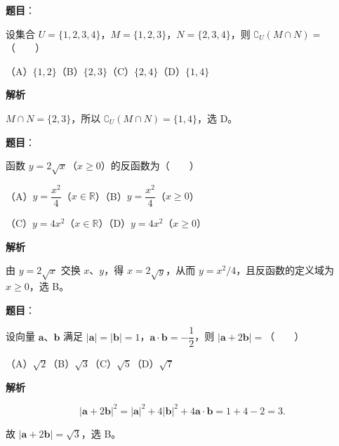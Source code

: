

\begin{answer}

\textbf{题目}：

设集合 $U=\{1,2,3,4\}$，$M=\{1,2,3\}$，$N=\{2,3,4\}$，则 $\complement_U(M\cap N)=$\mbox{（　　）}

（A）$\{1,2\}$\quad（B）$\{2,3\}$\quad（C）$\{2,4\}$\quad（D）$\{1,4\}$

\textbf{解析}

$M\cap N=\{2,3\}$，所以
$\complement_U(M\cap N)=\{1,4\}$，选 D。


\end{answer}
\begin{answer}

\textbf{题目}：

函数 $y=2\sqrt{x}$（$x\geq0$）的反函数为\mbox{（　　）}

（A）$y=\dfrac{x^2}{4}$（$x\in\mathbb R$）\quad（B）$y=\dfrac{x^2}{4}$（$x\geq0$）

（C）$y=4x^2$（$x\in\mathbb R$）\quad（D）$y=4x^2$（$x\geq0$）

\textbf{解析}

由 $y=2\sqrt{x}$ 交换 $x\text{、}y$，得
$x=2\sqrt{y}$，从而 $y=x^2/4$，且反函数的定义域为 $x\geq0$，选 B。


\end{answer}
\begin{answer}

\textbf{题目}：

设向量 $\boldsymbol a\text{、}\boldsymbol b$ 满足 $|\boldsymbol a|=|\boldsymbol b|=1$，$\boldsymbol a\cdot\boldsymbol b=-\dfrac12$，则 $|\boldsymbol a+2\boldsymbol b|=$\mbox{（　　）}

（A）$\sqrt2$\quad（B）$\sqrt3$\quad（C）$\sqrt5$\quad（D）$\sqrt7$

\textbf{解析}

\nopagebreak[4]
\[
|\boldsymbol a+2\boldsymbol b|^2
=|\boldsymbol a|^2+4|\boldsymbol b|^2+4\boldsymbol a\cdot\boldsymbol b
=1+4-2=3.
\]

故 $|\boldsymbol a+2\boldsymbol b|=\sqrt3$，选 B。


\end{answer}
